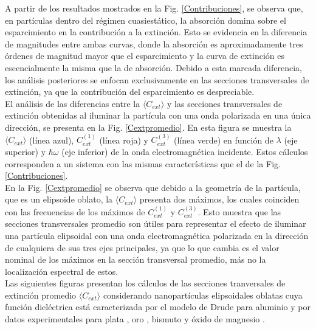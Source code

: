 A partir de los resultados mostrados en la Fig. \ref{Contribuciones}, se observa que, en partículas dentro del régimen cuasiestático, la absorción domina sobre el esparcimiento en la contribución a la extinción. Esto se evidencia en la diferencia de magnitudes entre ambas curvas, donde la absorción es aproximadamente tres órdenes de magnitud mayor que el esparcimiento y la curva de extinción es escencialmente la misma que la de absorción. Debido a esta marcada diferencia, los análisis posteriores se enfocan exclusivamente en las secciones transversales de extinción, ya que la contribución del esparcimiento es despreciable.\\

El análisis de las diferencias entre la $\langle C_{ext}\rangle$ y  las secciones transversales de extinción obtenidas al iluminar la partícula con una onda polarizada en una única dirección, se presenta en la Fig. \ref{Cextpromedio}. En esta figura se muestra la $\langle C_{ext}\rangle$ (línea azul), $C_{ext}^{(1)}$ (línea roja) y $C_{ext}^{(3)}$ (línea verde) en función de $\lambda$ (eje superior) y $\hbar\omega$ (eje inferior) de la onda electromagnética incidente. Estos cálculos corresponden a un sistema con las mismas características que el de la Fig. \ref{Contribuciones}.\\

En la Fig. \ref{Cextpromedio} se observa que debido a la geometría de la partícula, que es un elipsoide oblato, la 
$\langle C_{ext}\rangle$ presenta dos máximos, los cuales coinciden con las frecuencias de los máximos de $C_{ext}^{(1)}$ y $C_{ext}^{(3)}$. Esto muestra que las secciones transversales promedio son útiles para representar el efecto de iluminar una partícula elipsoidal con una onda electromagnética polarizada en la dirección de cualquiera de sus tres ejes principales, ya que lo que cambia es el valor nominal de los máximos en la sección transversal promedio, más no la localización espectral de estos. \\

Las siguientes figuras presentan los cálculos de las secciones tranversales de extinción promedio  $\langle C_{ext}\rangle$ considerando nanopartículas elipsoidales oblatas cuya función dieléctrica está caracterizada por el modelo de Drude para aluminio \cite{Aluminio} y por datos experimentales para plata \cite{Plata}, oro \cite{Plata}, bismuto \cite{Bismuto} y  óxido de magnesio \cite{MgO}.



